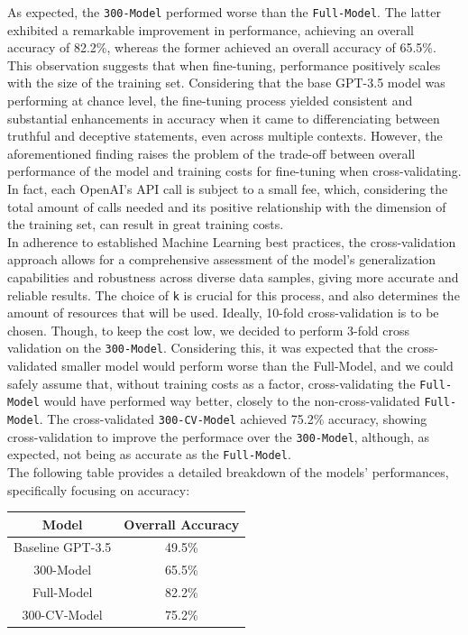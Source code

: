 \documentclass[10pt,twocolumn,letterpaper]{article}
\begin{document}
As expected, the \texttt{300-Model} performed worse than the \texttt{Full-Model}. The latter exhibited a 
remarkable improvement in performance, achieving an overall accuracy of 82.2\%, whereas the former achieved an overall accuracy of 65.5\%.
This observation suggests that when fine-tuning, performance positively scales with the size
of the training set. Considering that the base GPT-3.5 model was performing at chance level, the fine-tuning process
yielded consistent and substantial enhancements in accuracy when it came to differenciating
between truthful and deceptive statements, even across multiple contexts. 
However, the aforementioned finding raises the problem of the trade-off between overall performance of the model
and training costs for fine-tuning when cross-validating. In fact, each OpenAI's API call is subject to a small fee, which, considering 
the total amount of calls needed and its positive relationship with the dimension of the training set, can result in great training costs. \\

In adherence to established Machine Learning best practices, the cross-validation approach allows for a comprehensive assessment 
of the model's generalization capabilities and robustness across diverse data samples, giving more accurate and reliable results. The choice of \texttt{k} 
is crucial for this process, and also determines the amount of resources that will be used. Ideally, 10-fold cross-validation is to be chosen.
Though, to keep the cost low, we decided to perform 3-fold cross validation on the \texttt{300-Model}. Considering this, it was expected that the cross-validated
smaller model would perform worse than the Full-Model, and we could safely assume that, without training costs as a factor, cross-validating the \texttt{Full-Model}
would have performed way better, closely to the non-cross-validated \texttt{Full-Model}.
The cross-validated \texttt{300-CV-Model} achieved 75.2\% accuracy, showing cross-validation to improve the performace over the \texttt{300-Model},
although, as expected, not being as accurate as the \texttt{Full-Model}. \\

The following table provides a detailed breakdown of the models' performances,
specifically focusing on accuracy:

\begin{center}

    \begin{tabular}{cc}
        \toprule
        Model & Overrall Accuracy \\
        \midrule
        Baseline GPT-3.5  & 49.5\% \\
        \midrule
        300-Model & 65.5\% \\
        \midrule
        Full-Model & 82.2\% \\
         \midrule
        300-CV-Model & 75.2\% \\
        \bottomrule
    \end{tabular}
    
\end{center}
\end{document}
